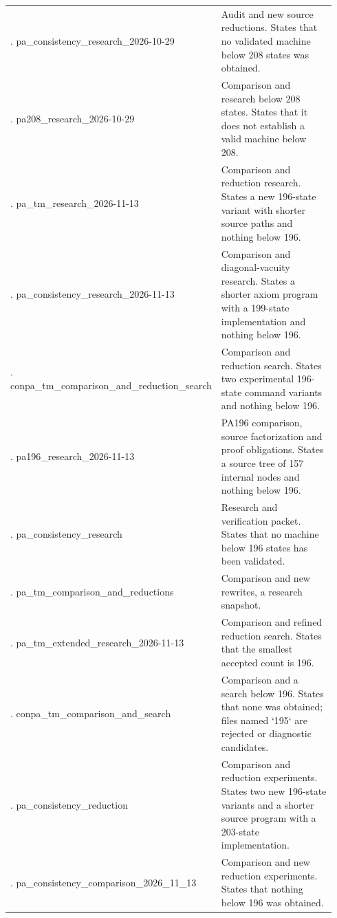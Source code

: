 {\begin{longtable}{@{}>{\raggedright\arraybackslash}p{0.34\linewidth}>{\raggedright\arraybackslash}p{0.60\linewidth}@{}}
10. pa\_\allowbreak{}consistency\_\allowbreak{}research\_\allowbreak{}2026-10-29 & Audit and new source reductions. States that no validated machine below 208 states was obtained.\\[5pt]
11. pa208\_\allowbreak{}research\_\allowbreak{}2026-10-29 & Comparison and research below 208 states. States that it does not establish a valid machine below 208.\\[5pt]
12. pa\_\allowbreak{}tm\_\allowbreak{}research\_\allowbreak{}2026-11-13 & Comparison and reduction research. States a new 196-state variant with shorter source paths and nothing below 196.\\[5pt]
13. pa\_\allowbreak{}consistency\_\allowbreak{}research\_\allowbreak{}2026-11-13 & Comparison and diagonal-vacuity research. States a shorter axiom program with a 199-state implementation and nothing below 196.\\[5pt]
14. conpa\_\allowbreak{}tm\_\allowbreak{}comparison\_\allowbreak{}and\_\allowbreak{}reduction\_\allowbreak{}search & Comparison and reduction search. States two experimental 196-state command variants and nothing below 196.\\[5pt]
15. pa196\_\allowbreak{}research\_\allowbreak{}2026-11-13 & PA196 comparison, source factorization and proof obligations. States a source tree of 157 internal nodes and nothing below 196.\\[5pt]
16. pa\_\allowbreak{}consistency\_\allowbreak{}research & Research and verification packet. States that no machine below 196 states has been validated.\\[5pt]
17. pa\_\allowbreak{}tm\_\allowbreak{}comparison\_\allowbreak{}and\_\allowbreak{}reductions & Comparison and new rewrites, a research snapshot.\\[5pt]
18. pa\_\allowbreak{}tm\_\allowbreak{}extended\_\allowbreak{}research\_\allowbreak{}2026-11-13 & Comparison and refined reduction search. States that the smallest accepted count is 196.\\[5pt]
19. conpa\_\allowbreak{}tm\_\allowbreak{}comparison\_\allowbreak{}and\_\allowbreak{}search & Comparison and a search below 196. States that none was obtained; files named `195` are rejected or diagnostic candidates.\\[5pt]
20. pa\_\allowbreak{}consistency\_\allowbreak{}reduction & Comparison and reduction experiments. States two new 196-state variants and a shorter source program with a 203-state implementation.\\[5pt]
21. pa\_\allowbreak{}consistency\_\allowbreak{}comparison\_\allowbreak{}2026\_\allowbreak{}11\_\allowbreak{}13 & Comparison and new reduction experiments. States that nothing below 196 was obtained.\\[5pt]

\end{longtable}}
